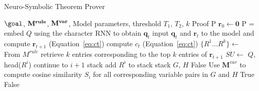 \begin{algorithm}[t]
\caption{Neuro-Symbolic Theorem Prover}
\label{alg:inference}
\begin{algorithmic}
    \Input \textGoal $\goal$, $\bf{M}^{rule}$, $\bf{M}^{var}$, Model parameters, threshold $T_1$, $T_2$, $k$
    \Output Proof P
    \State $\mathbf{r}_0 \leftarrow \mathbf{0} $ 
    \State P = 
        \State embed $Q$ using the character RNN to obtain $\mathbf{q}_t$
        \State input $\mathbf{q}_t$ and $\mathbf{r}_t$ to the model and compute $\mathbf{r}_{t+1}$ (Equation~\eqref{eq:ct})
        \State compute $c_t$ (Equation~\eqref{eq:ct})
        \State $\{ R^{1} \dots R^{k} \} \leftarrow $ From $M^{rule}$ retrieve $k$ entries corresponding to the top $k$ entries of $\mathbf{r}_{t+1}$ 
            \State $SU \leftarrow$  {$Q$, head($R^i$)}
                \State continue to $i+1$
            \Else
                	\State \Return stack
                \EndIf
                \State add $R^{i}$ to stack
                \State {} 
            \EndIf
        \EndFor
        \Return stack
    \EndFunction
     {$G$, $H$}
            \State \Return False
        \EndIf
        \State Use $\mathbf{M}^{var}$ to compute cosine similarity $S_i$ for all corresponding variable pairs in $G$ and $H$
            \State \Return True
        \Else
            \State \Return False
        \EndIf
    \EndFunction
\end{algorithmic}
\end{algorithm}